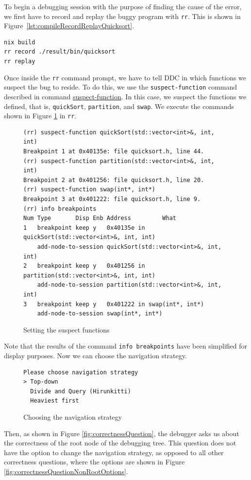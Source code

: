 To begin a debugging session with the purpose of finding the cause of the error, we first have to record and replay the buggy program with \verb|rr|. This is shown in
Figure~\ref{lst:compileRecordReplayQuicksort}.
\begin{lstlisting}[language=bash, caption={Compiling, recording and replaying quickSort}, frame=tb, label={lst:compileRecordReplayQuicksort}]
nix build
rr record ./result/bin/quicksort
rr replay
\end{lstlisting}
Once inside the \verb|rr| command prompt, we have to tell DDC in which functions we suspect the bug to reside.
To do this, we use the \verb|suspect-function| command described in command \hyperref[command:suspect-function]{suspect-function}. In this case, we suspect the functions we defined, that is, \verb|quickSort|, \verb|partition|, and \verb|swap|. We execute the commands shown in Figure \ref{fig:suspecting-functions} in \verb|rr|.
\begin{figure}[h]
    \centering
    \caption{Setting the suspect functions}
    \label{fig:suspecting-functions}
    \begin{verbatim}
(rr) suspect-function quickSort(std::vector<int>&, int, int)
Breakpoint 1 at 0x40135e: file quicksort.h, line 44.
(rr) suspect-function partition(std::vector<int>&, int, int)
Breakpoint 2 at 0x401256: file quicksort.h, line 20.
(rr) suspect-function swap(int*, int*)
Breakpoint 3 at 0x401222: file quicksort.h, line 9.
(rr) info breakpoints
Num Type       Disp Enb Address         What
1   breakpoint keep y   0x40135e in quickSort(std::vector<int>&, int, int)
    add-node-to-session quickSort(std::vector<int>&, int, int)
2   breakpoint keep y   0x401256 in partition(std::vector<int>&, int, int)
    add-node-to-session partition(std::vector<int>&, int, int)
3   breakpoint keep y   0x401222 in swap(int*, int*)
    add-node-to-session swap(int*, int*)
    \end{verbatim}
\end{figure}
Note that the results of the command \verb|info breakpoints| have been simplified for display purposes.
Now we can choose the navigation strategy.
\begin{figure}[h]
    \centering
    \caption{Choosing the navigation strategy}
    \label{fig:navigationsStrategyPrompt}
    \begin{verbatim}
Please choose navigation strategy
> Top-down
  Divide and Query (Hirunkitti)
  Heaviest first
    \end{verbatim}
\end{figure}
Then, as shown in Figure \ref{fig:correctnessQuestion}, the debugger asks us about the correctness of the root node of the debugging tree. This question does not have the option to change the navigation strategy, as opposed to all other correctness questions, where the options are shown in Figure \ref{fig:correctnessQuestionNonRootOptions}.

